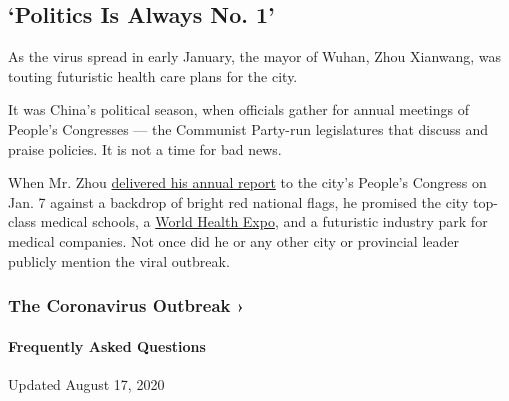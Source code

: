 \hypertarget{politics-is-always-no-1}{%
\subsection{`Politics Is Always No. 1'}\label{politics-is-always-no-1}}

As the virus spread in early January, the mayor of Wuhan, Zhou Xianwang,
was touting futuristic health care plans for the city.

It was China's political season, when officials gather for annual
meetings of People's Congresses --- the Communist Party-run legislatures
that discuss and praise policies. It is not a time for bad news.

When Mr. Zhou \href{http://www.whtv.com.cn/p/19064.html}{delivered his
annual report} to the city's People's Congress on Jan. 7 against a
backdrop of bright red national flags, he promised the city top-class
medical schools, a \href{https://www.hbwhexpo.com/}{World Health Expo},
and a futuristic industry park for medical companies. Not once did he or
any other city or provincial leader publicly mention the viral outbreak.

\href{https://www.nytimes3xbfgragh.onion/news-event/coronavirus?action=click\&pgtype=Article\&state=default\&region=MAIN_CONTENT_3\&context=storylines_faq}{}

\hypertarget{the-coronavirus-outbreak-}{%
\subsubsection{The Coronavirus Outbreak
›}\label{the-coronavirus-outbreak-}}

\hypertarget{frequently-asked-questions}{%
\paragraph{Frequently Asked
Questions}\label{frequently-asked-questions}}

Updated August 17, 2020

